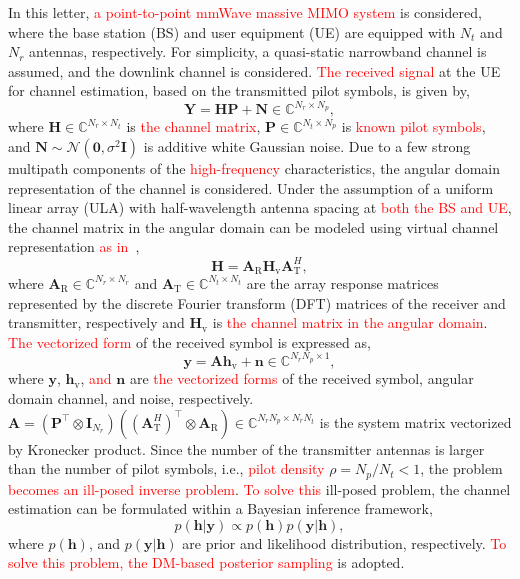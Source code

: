 \documentclass[lettersize,journal]{IEEEtran}
\newcommand{\tred}{\textcolor{red}}
\begin{document}
In this letter, \tred{a point-to-point mmWave massive MIMO system} is considered, where the base station (BS) and user equipment (UE) are equipped with $N_{t}$ and $N_{r}$ antennas, respectively. For simplicity, a quasi-static narrowband channel is assumed, and the downlink channel is considered. \tred{The received signal} at the UE for channel estimation, based on the transmitted pilot symbols, is given by,
\begin{equation}
\mathbf{Y}=\mathbf{H}\mathbf{P}+\mathbf{N}\in \mathbb{C}^{N_{r}\times N_{p}},
\end{equation}
where $\mathbf{H}\in \mathbb{C}^{N_{r}\times N_{t}}$ is \tred{the channel matrix}, $\mathbf{P}\in \mathbb{C}^{N_{t}\times N_{p}}$ is \tred{known pilot symbols}, and $\mathbf{N}\sim\mathcal{N}(\mathbf{0},\sigma^{2}\mathbf{I})$ is additive white Gaussian noise. Due to a few strong multipath components of the \tred{high-frequency} characteristics, the angular domain representation of the channel is considered. Under the assumption of a uniform linear array (ULA) with half-wavelength antenna spacing at \tred{both the BS and UE}, the channel matrix in the angular domain can be modeled using virtual channel representation \tred{as in}~\cite{sayeedDeconstructingMultiantennaFading2002},
\begin{equation}
\mathbf{H} = \mathbf{A}_{\text{R}}\mathbf{H}_{\text{v}}\mathbf{A}_{\text{T}}^{H},
\end{equation}
where $\mathbf{A}_{\text{R}}\in \mathbb{C}^{N_{r}\times N_{r}}$ and $\mathbf{A}_{\text{T}}\in \mathbb{C}^{N_{t}\times N_{t}}$ are the array response matrices represented by the discrete Fourier transform (DFT) matrices of the receiver and transmitter, respectively and $\mathbf{H}_{\text{v}}$ is \tred{the channel matrix in the angular domain}.
\tred{The vectorized form} of the received symbol is expressed as,
\begin{equation}
\mathbf{y} = \mathbf{A}\mathbf{h}_{\text{v}}+\mathbf{n}\in \mathbb{C}^{N_{r}N_{p}\times 1},
\end{equation}
where $\mathbf{y}$, $\mathbf{h}_{\text{v}}$, \tred{and} $\mathbf{n}$ are \tred{the vectorized forms} of the received symbol, angular domain channel, and noise, respectively. $\mathbf{A}=(\mathbf{P}^{\top}\otimes\mathbf{I}_{N_{r}})((\mathbf{A}_{\text{T}}^{H})^{\top}\otimes \mathbf{A}_{\text{R}})\in \mathbb{C}^{N_{r}N_{p}\times N_{r}N_{t}}$ is the system matrix vectorized by Kronecker product.
Since the number of the transmitter antennas is larger than the number of pilot symbols, i.e., \tred{pilot density} $\rho=N_{p}/N_{t}<1$, the problem \tred{becomes an ill-posed inverse problem}.
\tred{To solve this} ill-posed problem, the channel estimation can be formulated within a Bayesian inference framework,
\begin{equation}
  p(\mathbf{h}|\mathbf{y})\propto p(\mathbf{h})p(\mathbf{y}|\mathbf{h}),
\end{equation}
where $p(\mathbf{h})$, and $p(\mathbf{y}|\mathbf{h})$ are prior and likelihood distribution, respectively. \tred{To solve this problem, the DM-based posterior sampling} is adopted.
\end{document}
